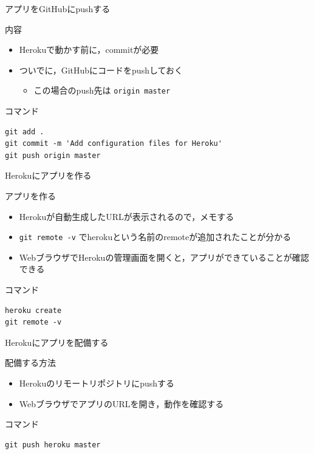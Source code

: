 \documentclass[t, aspectratio=169]{beamer}
\begin{document}
\begin{frame}[fragile,label=sec-5-2-4]{アプリをGitHubにpushする}
 \begin{block}{内容}
\begin{itemize}
\item Herokuで動かす前に，commitが必要
\item ついでに，GitHubにコードをpushしておく
\begin{itemize}
\item この場合のpush先は \texttt{origin master}
\end{itemize}
\end{itemize}
\end{block}
\begin{block}{コマンド}
\begin{verbatim}
git add .
git commit -m 'Add configuration files for Heroku'
git push origin master
\end{verbatim}
\end{block}
\end{frame}

\begin{frame}[fragile,label=sec-5-2-5]{Herokuにアプリを作る}
 \begin{block}{アプリを作る}
\begin{itemize}
\item Herokuが自動生成したURLが表示されるので，メモする
\item \texttt{git remote -v} でherokuという名前のremoteが追加されたことが分かる
\item WebブラウザでHerokuの管理画面を開くと，アプリができていることが確認できる
\end{itemize}
\end{block}

\begin{block}{コマンド}
\begin{verbatim}
heroku create
git remote -v
\end{verbatim}
\end{block}
\end{frame}

\begin{frame}[fragile,label=sec-5-2-6]{Herokuにアプリを配備する}
 \begin{block}{配備する方法}
\begin{itemize}
\item Herokuのリモートリポジトリにpushする
\item WebブラウザでアプリのURLを開き，動作を確認する
\end{itemize}
\end{block}
\begin{block}{コマンド}
\begin{verbatim}
git push heroku master
\end{verbatim}
\end{block}
\end{frame}
\end{document}
